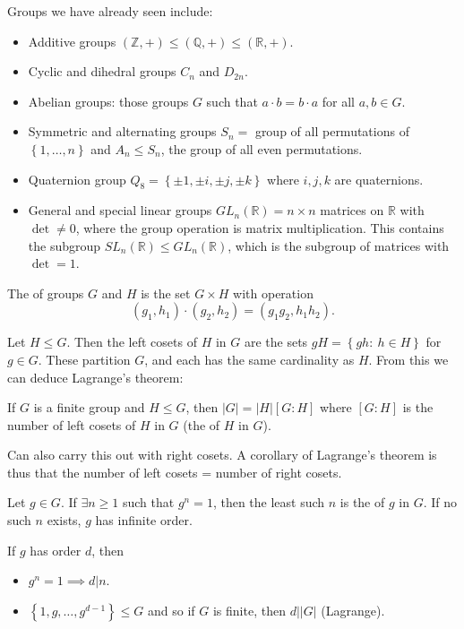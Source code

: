 \documentclass[egregdoesnotlikesansseriftitles,a4paper]{scrartcl}
\begin{document}
\begin{example*}
    Groups we have already seen include:
    \begin{itemize}
        \item Additive groups $(\mathbb{Z},+)\leq (\mathbb{Q},+)\leq (\mathbb{R},+)$.
        \item Cyclic and dihedral groups $C_{n}$ and $D_{2n}$.
        \item Abelian groups: those groups $G$ such that $a \cdot b= b \cdot a$ for all $a,b \in G$.
        \item Symmetric and alternating groups $S_{n}=$ group of all permutations of $\left\{1, \ldots ,n\right\}$ and $A_{n} \leq S_n$, the group of all even permutations.
        \item Quaternion group $Q_8 =\left\{\pm 1, \pm i, \pm j, \pm k\right\}$ where $i,j,k$ are quaternions.
        \item General and special linear groups $GL_{n}(\mathbb{R})= n \times n$ matrices on $\mathbb{R}$ with $\operatorname{det} \neq 0 $, where the group operation is matrix multiplication. This contains the subgroup $SL_{n}(\mathbb{R}) \leq GL_{n}(\mathbb{R})$, which is the subgroup of matrices with $\operatorname{det}=1 $. 
    \end{itemize}     
\end{example*}
\begin{definition*}
     The  of groups $G$ and $H$ is the set $G \times H$ with operation \[
     (g_1 , h_1 ) \cdot (g_2 ,h_2 )=(g_1 g_2 , h_1 h_2 )
     .\] 
\end{definition*}
\begin{theorem}
     Let $H \leq G$. Then the left cosets of $H$ in $G$ are the sets $gH=\left\{gh: \ h \in H\right\}$ for $g \in G$. These partition $G$, and each has the same cardinality as $H$. From this we can deduce Lagrange's theorem:

     If $G$ is a finite group and $H \leq G$, then $|G|=|H| [G:H]$ where $[G:H]$ is the number of left cosets of $H$ in $G$ (the  of $H$ in $G$).
     \begin{remark}
            Can also carry this out with right cosets. A corollary of Lagrange's theorem is thus that the number of left cosets = number of right cosets.
      \end{remark}
\end{theorem}
\begin{definition*}
     Let $g \in G$. If $\exists n \geq 1$ such that $g^{n}=1$, then the least such $n$ is the  of $g$ in $G$. If no such $n$ exists, $g$ has infinite order.
     \begin{remark}
      If $g$ has order $d$, then 
      \begin{itemize}
          \item $g^{n}=1 \implies d|n$. 
          \item $\left\{1,g, \ldots , g^{d-1}\right\}\leq G$ and so if $G$ is finite, then $d | |G|$ (Lagrange).
      \end{itemize}
 \end{remark}
\end{definition*}
\end{document}

